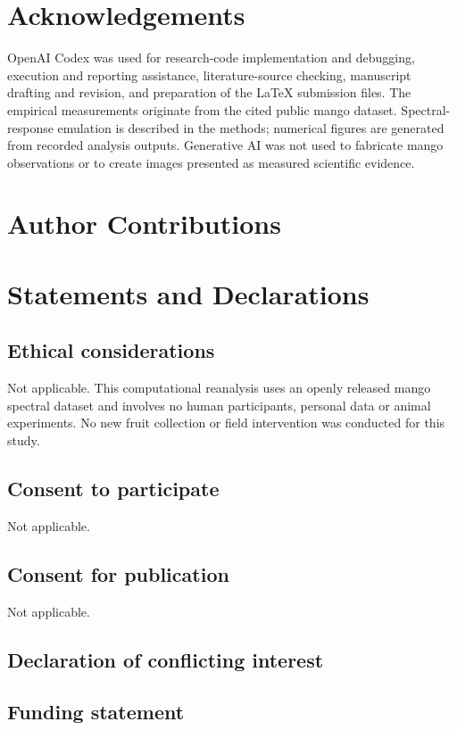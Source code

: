 \section*{Acknowledgements}
OpenAI Codex was used for research-code implementation and debugging, execution and reporting assistance, literature-source checking, manuscript drafting and revision, and preparation of the LaTeX submission files. The empirical measurements originate from the cited public mango dataset. Spectral-response emulation is described in the methods; numerical figures are generated from recorded analysis outputs. Generative AI was not used to fabricate mango observations or to create images presented as measured scientific evidence. \HumanReviewStatement

\AdditionalAcknowledgements

\section*{Author Contributions}
\AuthorContributions

\section*{Statements and Declarations}
\subsection*{Ethical considerations}
Not applicable. This computational reanalysis uses an openly released mango spectral dataset and involves no human participants, personal data or animal experiments. No new fruit collection or field intervention was conducted for this study.

\subsection*{Consent to participate}
Not applicable.

\subsection*{Consent for publication}
Not applicable.

\subsection*{Declaration of conflicting interest}
\ConflictStatement

\subsection*{Funding statement}
\FundingStatement

